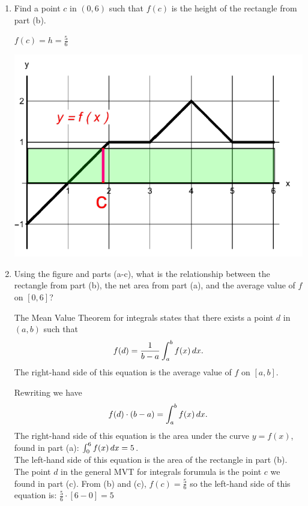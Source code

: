 \documentclass[nooutcomes]{ximera}
\begin{document}
\begin{problem}
\begin{enumerate}
          \item Find a point $c$ in $(0,6)$ such that $f(c)$ is the height of the rectangle from part (b).
     \begin{freeResponse}
    $f(c)=h=\frac{5}{6}$
            \begin{image}
          \includegraphics[scale = 0.5]{Images/figure7.png}
        \end{image}
     \end{freeResponse}
     \item
           Using the figure and parts (a-c), what is the relationship between the rectangle from part (b), the net area from part (a), and the average value of $f$ on $[0, 6]$?
      \begin{freeResponse}
        The Mean Value Theorem for integrals states that there exists a point $d$ in $(a, b)$ such that
        \[
          f(d) = \frac{1}{b-a}\int_a^b f(x) \,d x.
        \]
        The right-hand side of this equation is the average value of $f$ on $[a, b]$.

        Rewriting we have
        \[
        f(d) \cdot (b-a) = \int_a^b f(x) \,d x.
        \]
      The right-hand side of this equation is the area under the curve $y = f(x)$, found in part (a): $\int_0^6 f(x) \,d x=5$.\\
       The left-hand side of this equation is the area of the rectangle in part (b).  The point $d$ in the general MVT for integrals forumula is the point $c$ we found in part (c).  From (b) and (c), $f(c)=\frac{5}{6}$ so the left-hand side of this equation is:  $\frac{5}{6} \cdot [6-0]=5$ 
        \end{freeResponse}
     \end{enumerate}
     \end{problem}
\end{document}
